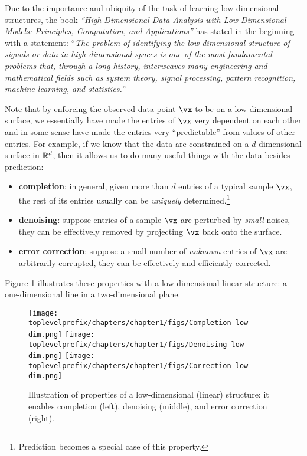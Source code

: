 \documentclass[\toplevelprefix/book-main.tex]{subfiles}
\begin{document}
Due to the importance and ubiquity of the task of  learning low-dimensional structures, the book {\em ``High-Dimensional Data Analysis with Low-Dimensional Models: Principles, Computation, and Applications''} \cite{Wright-Ma-2022} has stated in the beginning with a statement: ``{\em The problem of identifying the low-dimensional structure of signals or data in high-dimensional
spaces is one of the most fundamental problems that, through a long
history, interweaves many engineering and mathematical fields such as system
theory, signal processing, pattern recognition, machine learning, and statistics.}''

Note that by enforcing the observed data point $\vx$ to be on a low-dimensional surface, we essentially have made the entries of $\vx$ very dependent on each other and in some sense have made the entries very ``predictable'' from values of other entries. For example, if we know that the data are constrained on a $d$-dimensional surface in $\mathbb{R}^d$, then it allows us to do many useful things with the data besides prediction: %
\begin{itemize}
    \item \textbf{completion}: in general, given more than $d$ entries of a typical sample $\vx$, the rest of its entries usually can be {\em uniquely} determined.\footnote{Prediction becomes a special case of this property.} 
    \item \textbf{denoising}: suppose entries of a sample $\vx$ are perturbed by {\em small} noises, they can be effectively removed by projecting $\vx$ back onto the surface.
    \item \textbf{error correction}: suppose a small number of {\em unknown} entries of $\vx$ are arbitrarily corrupted, they can be effectively and efficiently corrected. 
\end{itemize}
Figure \ref{fig:low-dim-properties} illustrates these properties with a low-dimensional linear structure: a one-dimensional line in a two-dimensional plane. 

\begin{figure}
    \centering
    \texttt{[image: \\toplevelprefix/chapters/chapter1/figs/Completion-low-dim.png]}     \texttt{[image: \\toplevelprefix/chapters/chapter1/figs/Denoising-low-dim.png]} \texttt{[image: \\toplevelprefix/chapters/chapter1/figs/Correction-low-dim.png]} 
    \caption{Illustration of properties of a low-dimensional (linear) structure: it enables completion (left), denoising (middle), and error correction (right).}
    \label{fig:low-dim-properties}
\end{figure}
\end{document}
